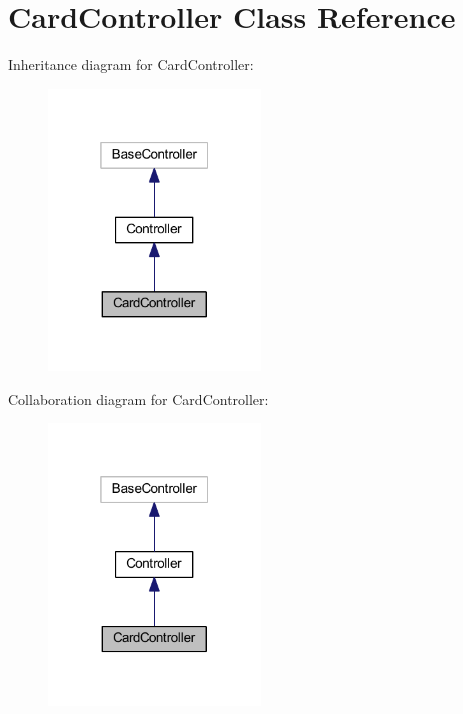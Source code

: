 \hypertarget{class_app_1_1_http_1_1_controllers_1_1_card_controller}{}\section{Card\+Controller Class Reference}
\label{class_app_1_1_http_1_1_controllers_1_1_card_controller}


Inheritance diagram for Card\+Controller\+:
\nopagebreak
\begin{figure}[H]
\begin{center}
\leavevmode
\includegraphics[width=160pt]{class_app_1_1_http_1_1_controllers_1_1_card_controller__inherit__graph}
\end{center}
\end{figure}


Collaboration diagram for Card\+Controller\+:
\nopagebreak
\begin{figure}[H]
\begin{center}
\leavevmode
\includegraphics[width=160pt]{class_app_1_1_http_1_1_controllers_1_1_card_controller__coll__graph}
\end{center}
\end{figure}

